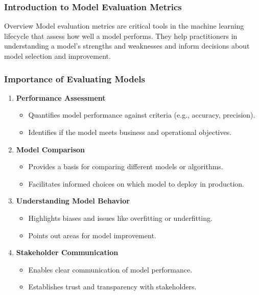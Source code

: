 \documentclass[aspectratio=169]{beamer}
\begin{document}
\frame{\titlepage}

\begin{frame}[fragile]
    \frametitle{Introduction to Model Evaluation Metrics}
    \begin{block}{Overview}
        Model evaluation metrics are critical tools in the machine learning lifecycle that assess how well a model performs. They help practitioners in understanding a model's strengths and weaknesses and inform decisions about model selection and improvement.
    \end{block}
\end{frame}

\begin{frame}[fragile]
    \frametitle{Importance of Evaluating Models}
    \begin{enumerate}
        \item \textbf{Performance Assessment}
        \begin{itemize}
            \item Quantifies model performance against criteria (e.g., accuracy, precision).
            \item Identifies if the model meets business and operational objectives.
        \end{itemize}
        
        \item \textbf{Model Comparison}
        \begin{itemize}
            \item Provides a basis for comparing different models or algorithms.
            \item Facilitates informed choices on which model to deploy in production.
        \end{itemize}
        
        \item \textbf{Understanding Model Behavior}
        \begin{itemize}
            \item Highlights biases and issues like overfitting or underfitting.
            \item Points out areas for model improvement.
        \end{itemize}
        
        \item \textbf{Stakeholder Communication}
        \begin{itemize}
            \item Enables clear communication of model performance.
            \item Establishes trust and transparency with stakeholders.
        \end{itemize}
    \end{enumerate}
\end{frame}
\end{document}
